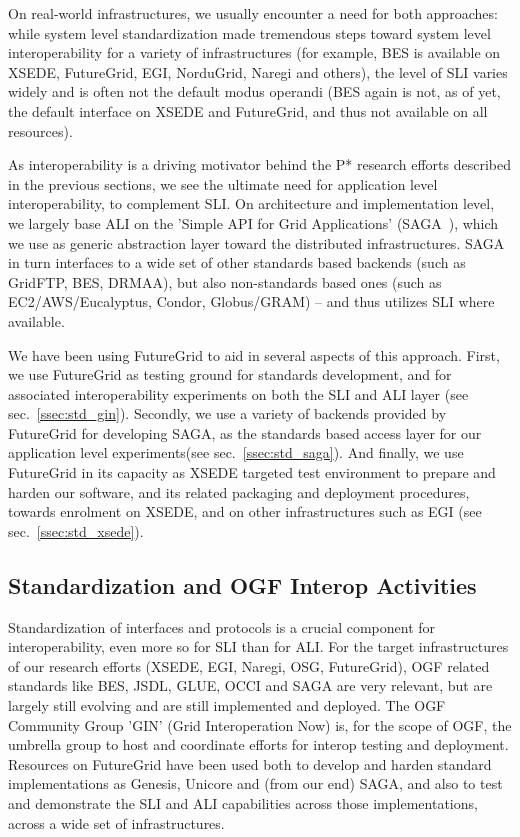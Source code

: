 \documentclass[]{paper}
\begin{document}
 On real-world infrastructures, we usually encounter a need for both
 approaches: while system level standardization made tremendous steps
 toward system level interoperability for a variety of infrastructures
 (for example, BES is available on XSEDE, FutureGrid, EGI, NorduGrid,
 Naregi and others), the level of SLI varies widely and is often not
 the default modus operandi (BES again is not, as of yet, the default
 interface on XSEDE and FutureGrid, and thus not available on all
 resources).  

 As interoperability is a driving motivator behind the P* research
 efforts described in the previous sections, we see the ultimate need
 for application level interoperability, to complement SLI.  On
 architecture and implementation level, we largely base ALI on the
 'Simple API for Grid Applications' (SAGA~\cite{ogf-gfd-90}), which we
 use as generic abstraction layer toward the distributed
 infrastructures.  SAGA in turn interfaces to a wide set of other
 standards based backends (such as GridFTP, BES, DRMAA), but also
 non-standards based ones (such as EC2/AWS/Eucalyptus, Condor,
 Globus/GRAM) -- and thus utilizes SLI where available.

 We have been using FutureGrid to aid in several aspects of this
 approach.  First, we use FutureGrid as testing ground for standards
 development, and for associated interoperability experiments on both
 the SLI and ALI layer (see sec.~\ref{ssec:std_gin}).  Secondly, we
 use a variety of backends provided by FutureGrid for developing SAGA,
 as the standards based access layer for our application level
 experiments(see sec.~\ref{ssec:std_saga}).  And finally, we use
 FutureGrid in its capacity as XSEDE targeted test environment to
 prepare and harden our software, and its related packaging and
 deployment procedures, towards enrolment on XSEDE, and on other
 infrastructures such as EGI (see sec.~\ref{ssec:std_xsede}).

\subsection*{Standardization and OGF Interop Activities}
\label{ssec:std_gin}

 Standardization of interfaces and protocols is a crucial component
 for interoperability, even more so for SLI than for ALI.  For the
 target infrastructures of our research efforts (XSEDE, EGI, Naregi,
 OSG, FutureGrid), OGF related standards like BES, JSDL, GLUE, OCCI
 and SAGA are very relevant, but are largely still evolving and are
 still implemented and deployed.  The OGF Community Group 'GIN' (Grid
 Interoperation Now) is, for the scope of OGF, the umbrella group to
 host and coordinate efforts for interop testing and deployment.
 Resources on FutureGrid have been used both to develop and harden
 standard implementations as Genesis, Unicore and (from our end) SAGA,
 and also to test and demonstrate the SLI and ALI capabilities across
 those implementations, across a wide set of infrastructures.
\end{document}
